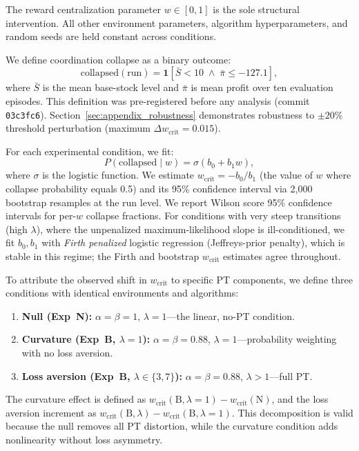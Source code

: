 \documentclass[letterpaper]{article}
\theoremstyle{plain}
\newcommand{\wcrit}{w_{\mathrm{crit}}}
\begin{document}
The reward centralization parameter $w \in [0,1]$ is the sole structural
intervention.
All other environment parameters, algorithm hyperparameters, and random
seeds are held constant across conditions.

We define coordination collapse as a binary outcome:
\begin{equation}
  \mathrm{collapsed}(\text{run}) = \mathbf{1}\!\left[
    \bar{S} < 10 \;\wedge\; \bar{\pi} \leq -127.1
  \right],
  \label{eq:collapse}
\end{equation}
where $\bar{S}$ is the mean base-stock level and $\bar{\pi}$ is mean
profit over ten evaluation episodes.
This definition was pre-registered before any analysis (commit
\texttt{03c3fc6}).
Section~\ref{sec:appendix_robustness} demonstrates robustness to $\pm 20\%$
threshold perturbation (maximum $\Delta\wcrit = 0.015$).

For each experimental condition, we fit:
\begin{equation}
  P(\mathrm{collapsed} \mid w) = \sigma(b_0 + b_1 w),
  \label{eq:logistic}
\end{equation}
where $\sigma$ is the logistic function.
We estimate $\wcrit = -b_0/b_1$ (the value of $w$ where collapse
probability equals 0.5) and its 95\% confidence interval via 2,000
bootstrap resamples at the run level.
We report Wilson score 95\% confidence intervals for per-$w$ collapse
fractions. For conditions with very steep transitions (high $\lambda$), where the
unpenalized maximum-likelihood slope is ill-conditioned, we fit
$b_0,b_1$ with \emph{Firth penalized} logistic regression (Jeffreys-prior
penalty), which is stable in this regime; the Firth and bootstrap $\wcrit$
estimates agree throughout.

To attribute the observed shift in $\wcrit$ to specific PT components, we
define three conditions with identical environments and algorithms:
\begin{enumerate}
  \item \textbf{Null (Exp~N):} $\alpha{=}\beta{=}1$, $\lambda{=}1$---the
        linear, no-PT condition.
  \item \textbf{Curvature (Exp~B, $\lambda{=}1$):}
        $\alpha{=}\beta{=}0.88$, $\lambda{=}1$---probability weighting
        with no loss aversion.
  \item \textbf{Loss aversion (Exp~B, $\lambda \in \{3,7\}$):}
        $\alpha{=}\beta{=}0.88$, $\lambda > 1$---full PT.
\end{enumerate}
The curvature effect is defined as
$\wcrit(\text{B},\lambda{=}1) - \wcrit(\text{N})$,
and the loss aversion increment as
$\wcrit(\text{B},\lambda) - \wcrit(\text{B},\lambda{=}1)$.
This decomposition is valid because the null removes all PT distortion,
while the curvature condition adds nonlinearity without loss asymmetry.
\end{document}
